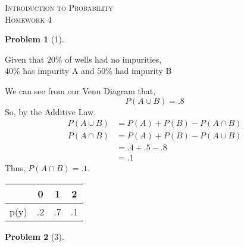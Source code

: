 \documentclass{article}
\theoremstyle{problem}
\newtheorem{prob}{Problem}
\def\Acircle{(180:1cm) circle (2cm)}
\def\Bcircle{(0:1cm) circle (2cm)}
\def\ABComp{(-3.5,-2.5) rectangle (3.5,2.5)}
\begin{document}
\begin{center}
  \textsc{\Large Introduction to Probability}\\[.3cm]
  \textsc{\Large Homework 4}
\end{center}

\begin{prob}[1]
 
\end{prob}
\begin{multicols}{2}
  Given that $20\%$ of wells had no impurities, \\$40\%$ has impurity A and $50\%$ had impurity B \\
  \vfill
  \columnbreak
  We can see from our Venn Diagram that, $$P(A \cup B) = .8$$ So, by the Additive Law, 
  \begin{align*}
    P(A \cup B) &= P(A) + P(B) - P(A \cap B)\\
    P(A \cap B) &= P(A) + P(B) - P(A \cup B)\\
                &= .4 + .5 - .8\\
                &= .1
  \end{align*}
    Thus, $P(A \cap B) = .1$.\\[.5cm]
 
  \begin{tabular}{r|c c c}
    & 0 & 1 & 2 \\
    \hline
    p(y) & .2 & .7 & .1
  \end{tabular}
\end{multicols}

\begin{prob}[3]
  
\end{prob}
\end{document}
